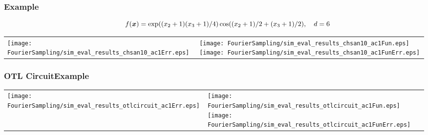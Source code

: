 \documentclass[11pt,compress,xcolor={usenames,dvipsnames},aspectratio=169]{beamer}
\begin{document}
\begin{frame}
\frametitle{Example}

\vspace{-9ex}
\[
{} \qquad \qquad f(\boldsymbol{x}) = \exp((x_2+1)(x_3+1)/4) \cos((x_2+1)/2 + (x_3+1)/2), \quad d = 6
\]
\vspace{-4ex}

\begin{tabular}{>{\centering}m{}>{\centering}m{}}
	\texttt{[image: FourierSampling/sim\_eval\_results\_chsan10\_ac1Err.eps]} &
	\texttt{[image: FourierSampling/sim\_eval\_results\_chsan10\_ac1Fun.eps]} \newline
	\texttt{[image: FourierSampling/sim\_eval\_results\_chsan10\_ac1FunErr.eps]}
\end{tabular}



\end{frame}


\begin{frame}
\frametitle{OTL CircuitExample}

\vspace{-6ex}

\begin{tabular}{>{\centering}m{}>{\centering}m{}}
	\texttt{[image: FourierSampling/sim\_eval\_results\_otlcircuit\_ac1Err.eps]} &
	\texttt{[image: FourierSampling/sim\_eval\_results\_otlcircuit\_ac1Fun.eps]} \newline
	\texttt{[image: FourierSampling/sim\_eval\_results\_otlcircuit\_ac1FunErr.eps]}
\end{tabular}



\end{frame}
\end{document}
